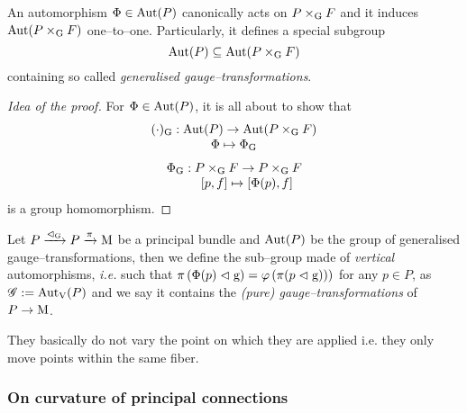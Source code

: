 \begin{prop}\label{gauge_action_Aut(P)}
    An automorphism $\Phi\in\text{\normalfont Aut}(P)$ canonically acts on $P\times_{\text{\normalfont G}} F$ and it induces $\text{\normalfont Aut}(P\times_{\text{\normalfont G}} F)$ one--to--one. Particularly, it defines a special subgroup $$\text{\normalfont Aut}(P)\subseteq\text{\normalfont Aut}(P\times_{\text{\normalfont G}} F)$$
    containing so called \emph{generalised gauge--transformations}.
\end{prop}
\begin{proof}[Idea of the proof]
For $\Phi\in\text{\normalfont Aut}(P)$, it is all about to show that
    $$\begin{matrix}
        (\cdot)_{\text{\normalfont G}}:\text{\normalfont Aut}(P)\to\text{\normalfont Aut}(P\times_{\text{\normalfont G}} F)\\
        \Phi\mapsto\Phi_{\text{\normalfont G}}
    \end{matrix}$$
    $$\begin{matrix}
        \Phi_{\text{\normalfont G}}:P\times_{\text{\normalfont G}} F\to P\times_{\text{\normalfont G}} F\\
        \qquad[p,f]\mapsto[\Phi(p),f]
    \end{matrix}$$
    is a group homomorphism.
\end{proof}

\begin{defi}\label{gauge_transf_def}
    Let $P\xrightarrow{\vartriangleleft_{\text{\normalfont G}}}P\xrightarrow{\pi}\text{\normalfont M}$ be a principal bundle and $\text{\normalfont Aut}(P)$ be the group of generalised gauge--transformations, then we define the sub--group made of \emph{vertical} automorphisms, \emph{i.e.} such that $\pi\left(\Phi(p)\vartriangleleft\text{\normalfont g}\right)=\varphi\left(\pi(p\vartriangleleft\text{\normalfont g}))\right)$ for any $p\in P$, as $\mathscr{G}:=\text{\normalfont Aut}_{\text{\normalfont V}}(P)$ and we say it contains the \emph{(pure) gauge--transformations} of $P\to\text{\normalfont M}$.
\end{defi}
They basically do not vary the point on which they are applied i.e. they only move points within the same fiber. 

\subsubsection{On curvature of principal connections}

